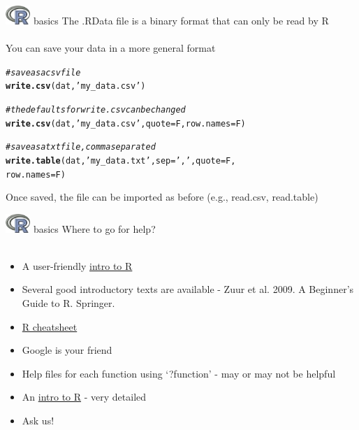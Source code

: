 \documentclass[xcolor=svgnames]{beamer}\usepackage[]{graphicx}\usepackage[]{color}
\makeatletter
\newcommand{\hlstr}[1]{\textcolor[rgb]{0.192,0.494,0.8}{#1}}%
\newcommand{\hlcom}[1]{\textcolor[rgb]{0.678,0.584,0.686}{\textit{#1}}}%
\newcommand{\hlstd}[1]{\textcolor[rgb]{0.345,0.345,0.345}{#1}}%
\newcommand{\hlkwc}[1]{\textcolor[rgb]{0.333,0.667,0.333}{#1}}%
\newcommand{\hlkwd}[1]{\textcolor[rgb]{0.737,0.353,0.396}{\textbf{#1}}}%
\newenvironment{kframe}{%
 \def\at@end@of@kframe{}%
 \ifinner\ifhmode%
  \def\at@end@of@kframe{\end{minipage}}%
  \begin{minipage}{\columnwidth}%
 \fi\fi%
 \def\FrameCommand##1{\hskip\@totalleftmargin \hskip-\fboxsep
 \colorbox{shadecolor}{##1}\hskip-\fboxsep
     \hskip-\linewidth \hskip-\@totalleftmargin \hskip\columnwidth}%
 \MakeFramed {\advance\hsize-\width
   \@totalleftmargin\z@ \linewidth\hsize
   \@setminipage}}%
 {\par\unskip\endMakeFramed%
 \at@end@of@kframe}
\newenvironment{knitrout}{}{} %
\makeatother
\begin{document}
\begin{frame}[t,fragile]{\includegraphics[width=0.07\textwidth]{Rlogo.jpg} \hspace{0.01in} basics}
The .RData file is a binary format that can only be read by R\\~\\
You can save your data in a more general format 
\begin{knitrout}\scriptsize
{}\color{fgcolor}\begin{kframe}
\begin{alltt}
\hlcom{# save as a csv file}
\hlkwd{write.csv}\hlstd{(dat,} \hlstr{'my_data.csv'}\hlstd{)}

\hlcom{# the defaults for write.csv can be changed}
\hlkwd{write.csv}\hlstd{(dat,} \hlstr{'my_data.csv'}\hlstd{,} \hlkwc{quote} \hlstd{= F,} \hlkwc{row.names} \hlstd{= F)}

\hlcom{# save as a txt file, comma separated}
\hlkwd{write.table}\hlstd{(dat,} \hlstr{'my_data.txt'}\hlstd{,} \hlkwc{sep} \hlstd{=} \hlstr{','}\hlstd{,} \hlkwc{quote} \hlstd{= F,}
  \hlkwc{row.names} \hlstd{= F)}
\end{alltt}
\end{kframe}
\end{knitrout}
Once saved, the file can be imported as before (e.g., read.csv, read.table)
\end{frame}

\begin{frame}[t,fragile]{\includegraphics[width=0.07\textwidth]{Rlogo.jpg} \hspace{0.01in} basics}
Where to go for help?\\~\\
\begin{itemize}
\addtolength{\itemsep}{0.08in}
\item A user-friendly \href{http://www.statmethods.net/}{intro to R} 
\item Several good introductory texts are available - Zuur et al. 2009. A Beginner's Guide to R. Springer. 
\item \href{http://cran.r-project.org/doc/contrib/Short-refcard.pdf}{R cheatsheet}
\item Google is your friend
\item Help files for each function using `?function' - may or may not be helpful
\item An \href{http://cran.r-project.org/doc/manuals/R-intro.html}{intro to R} - very detailed
\item Ask us!
\end{itemize}
\end{frame}
\end{document}
